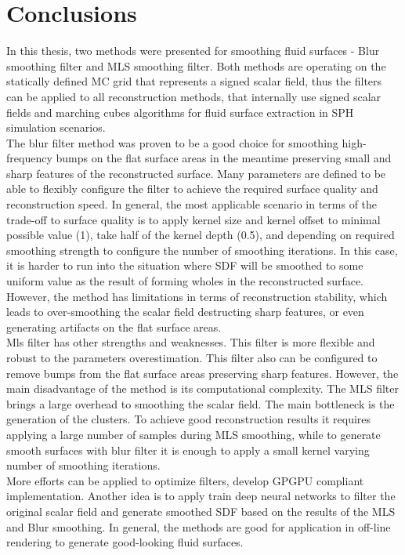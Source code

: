 \chapter{Conclusions}
In this thesis, two methods were presented for smoothing fluid surfaces - Blur smoothing filter and MLS smoothing filter. Both methods are operating on the statically defined MC grid that represents a signed scalar field, thus the filters can be applied to all reconstruction methods, that internally use signed scalar fields and marching cubes algorithms for fluid surface extraction in SPH simulation scenarios.\\
The blur filter method was proven to be a good choice for smoothing high-frequency bumps on the flat surface areas in the meantime preserving small and sharp features of the reconstructed surface. Many parameters are defined to be able to flexibly configure the filter to achieve the required surface quality and reconstruction speed. In general, the most applicable scenario in terms of the trade-off to surface quality is to apply kernel size and kernel offset to minimal possible value (1), take half of the kernel depth (0.5), and depending on required smoothing strength to configure the number of smoothing iterations. In this case, it is harder to run into the situation where SDF will be smoothed to some uniform value as the result of forming wholes in the reconstructed surface.
However, the method has limitations in terms of reconstruction stability, which leads to over-smoothing the scalar field destructing sharp features, or even generating artifacts on the flat surface areas.\\
Mls filter has other strengths and weaknesses. This filter is more flexible and robust to the parameters overestimation. This filter also can be configured to remove bumps from the flat surface areas preserving sharp features. However, the main disadvantage of the method is its computational complexity. The MLS filter brings a large overhead to smoothing the scalar field. The main bottleneck is the generation of the clusters. To achieve good reconstruction results it requires applying a large number of samples during MLS smoothing, while to generate smooth surfaces with blur filter it is enough to apply a small kernel varying number of smoothing iterations.\\
More efforts can be applied to optimize filters, develop GPGPU compliant implementation. Another idea is to apply train deep neural networks to filter the original scalar field and generate smoothed SDF based on the results of the MLS and Blur smoothing. In general, the methods are good for application in off-line rendering to generate good-looking fluid surfaces.